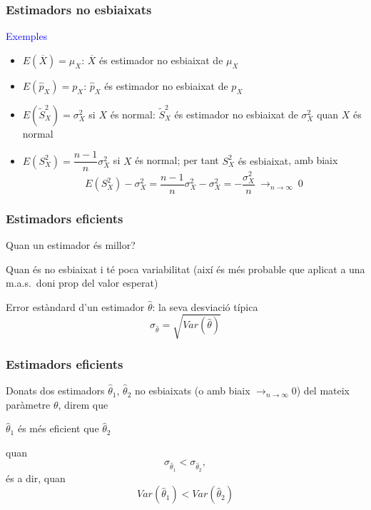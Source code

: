 \documentclass[12pt,t]{beamer}
\newcommand{\blue}[1]{\textcolor{blue}{#1}}
\renewcommand{\emph}[1]{{\color{red}#1}}
\def\tendeix{{\displaystyle\mathop{\longrightarrow}_{\scriptscriptstyle
n\to\infty}}}
\theoremstyle{plain}
\theoremstyle{definition}
\begin{document}
\begin{frame}
\frametitle{Estimadors no esbiaixats}


\blue{Exemples}

\begin{itemize}
\item $E(\overline{X})=\mu_X$: $\overline{X}$ és estimador no esbiaixat de $\mu_X$
\medskip

\item $E(\widehat{p}_X)=p_X$: $\widehat{p}_X$ és estimador no esbiaixat de $p_X$
\medskip

\item $E(\widetilde{S}_{X}^2)=\sigma_X^2$ si $X$ és normal: $\widetilde{S}_{X}^2$ és estimador no esbiaixat de $\sigma_X^2$ quan $X$ és normal
\medskip

\item $E({S}_{X}^2)=\dfrac{n-1}{n}\sigma_X^2$ si $X$ és normal; per tant
\emph{${S}_{X}^2$ és esbiaixat}, amb biaix
$$
E({S}_{X}^2)-\sigma_X^2=\dfrac{n-1}{n}\sigma_X^2-\sigma_X^2=-\dfrac{\sigma_X^2}{n}\ \tendeix\ 0
$$

\end{itemize}

\end{frame}


\begin{frame}
\frametitle{Estimadors eficients}

Quan un estimador és \emph{millor}?
\medskip

Quan és no esbiaixat i té poca variabilitat (així és més probable que aplicat a una m.a.s.\ doni prop del valor esperat)
\medskip

\emph{Error estàndard d'un estimador $\widehat{\theta}$}: la seva desviació típica
$$\sigma_{\widehat{\theta}}=\sqrt{Var(\widehat{\theta})}$$
\medskip

\end{frame}


\begin{frame}
\frametitle{Estimadors eficients}

Donats dos estimadors $\widehat{\theta}_1$, $\widehat{\theta}_2$ no esbiaixats (o amb biaix $\tendeix 0$) del mateix paràmetre $\theta$, direm que 
\begin{center}
$\widehat{\theta}_1$ és \emph{més eficient} que $\widehat{\theta}_2$
\end{center}
 quan $$\sigma_{\widehat{\theta}_1}< \sigma_{\widehat{\theta}_2},$$  és a dir, quan $$Var(\widehat{\theta}_1)< Var(\widehat{\theta}_2)$$


\end{frame}
\end{document}
